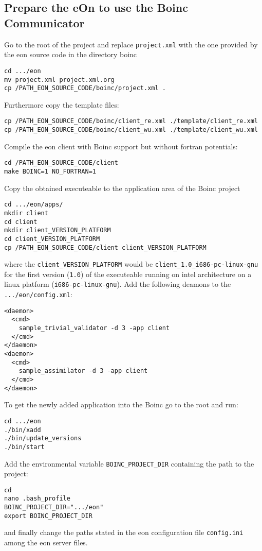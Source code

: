 \documentclass{article}
\begin{document}
\subsection{Prepare the eOn to use the Boinc Communicator}
Go to the root of the project and replace \texttt{project.xml} with the one provided by the eon source code in the directory boinc
\begin{verbatim}
cd .../eon
mv project.xml project.xml.org
cp /PATH_EON_SOURCE_CODE/boinc/project.xml .
\end{verbatim}
%
Furthermore copy the template files:
\begin{verbatim}
cp /PATH_EON_SOURCE_CODE/boinc/client_re.xml ./template/client_re.xml
cp /PATH_EON_SOURCE_CODE/boinc/client_wu.xml ./template/client_wu.xml
\end{verbatim}
%
Compile the eon client with Boinc support but without fortran potentials:
\begin{verbatim}
cd /PATH_EON_SOURCE_CODE/client
make BOINC=1 NO_FORTRAN=1
\end{verbatim}
%
Copy the obtained executeable to the application area of the Boinc project
\begin{verbatim}
cd .../eon/apps/
mkdir client
cd client
mkdir client_VERSION_PLATFORM
cd client_VERSION_PLATFORM
cp /PATH_EON_SOURCE_CODE/client client_VERSION_PLATFORM
\end{verbatim}
where the \texttt{client\_VERSION\_PLATFORM} would be \texttt{client\_1.0\_i686-pc-linux-gnu} for the first version (\texttt{1.0}) of the executeable running on intel architecture on a linux platform (\texttt{i686-pc-linux-gnu}).
Add the following deamons to the \texttt{.../eon/config.xml}:
\begin{verbatim}
<daemon>
  <cmd>
    sample_trivial_validator -d 3 -app client
  </cmd>
</daemon>
<daemon>
  <cmd>
    sample_assimilator -d 3 -app client
  </cmd>
</daemon> 
\end{verbatim}
%
To get the newly added application into the Boinc go to the root and run:
\begin{verbatim}
cd .../eon
./bin/xadd
./bin/update_versions
./bin/start
\end{verbatim}
%
Add the environmental variable \texttt{BOINC\_PROJECT\_DIR} containing the path to the project:
\begin{verbatim}
cd
nano .bash_profile
BOINC_PROJECT_DIR=".../eon"
export BOINC_PROJECT_DIR
\end{verbatim}
and finally change the paths stated in the eon configuration file \texttt{config.ini} among the eon server files.
\end{document}
